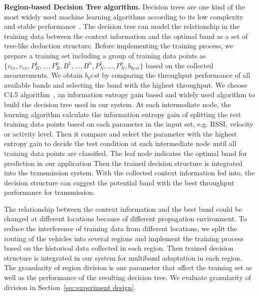 {\bf Region-based Decision Tree algorithm.} Decision trees are one kind of the most 
widely used machine learning 
algorithms according to its low complexity and stable performance~\cite{banfield2007}.
The decision tree can model the relationship in the training data between the context 
information and the optimal band as a set of tree-like deduction structure. Before 
implementing the training process, we prepare a training set including a group of 
training data points as $\{v_{tx}, v_{rx}, P_R^1, ..., P_R^n,  B^1, ..., B^n, P_N^1, 
..., P_N^n, b_{best}\}$ based on the collected measurements. We obtain $b_best$ by comparing
the throughput performance of all available bands and selecting the band with the highest 
throughput. We choose C4.5 algorithm~\cite{hall2009weka}, an information entropy gain based
and widely used algorithm to build the decision tree used in our system. At each intermediate
node, the learning algorithm calculate the information entropy gain of splitting the rest 
training data points based on each parameter in the input set, e.g. RSSI, velocity or 
activity level. Then it compare and select the parameter with the highest entropy gain
to decide the test condition at each intermediate node until all training data points are
classified. The leaf node indicates the optimal band for prediction in our application
Then the trained decision structure is integrated into the transmission system. With the
collected context information fed into, the decision structure can suggest the potential 
band with the best throughput performance for transmission. 

The relationship between the context information and the best band could be changed at 
different locations because of different propagation environment. To reduce the interference
of training data from different locations, we split the routing of the 
vehicles into several regions and implement the training process based on the historical 
data collected in each region. Then trained decision structure is integrated in our system 
for multiband adaptation in each region. The granularity of region division is one parameter
that affect the training set as well as the performance of the resulting decision tree. We 
evaluate granularity of division in Section~\ref{sec:experiment design}.
